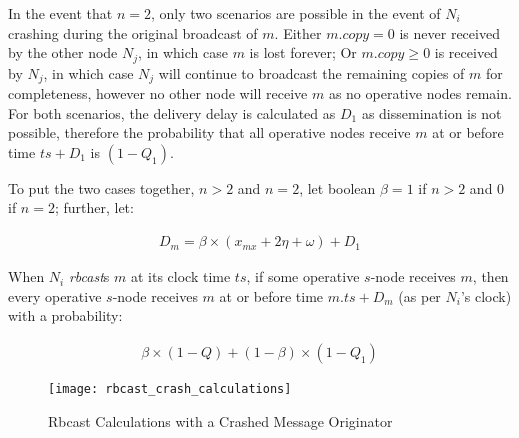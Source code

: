 In the event that $n = 2$, only two scenarios are possible in the event of $N_i$ crashing during the original broadcast of $m$.  Either $m.copy = 0$ is never received by the other node $N_j$, in which case $m$ is lost forever; Or $m.copy \geq 0$ is received by $N_j$, in which case $N_j$ will continue to broadcast the remaining copies of $m$ for completeness, however no other node will receive $m$ as no operative nodes remain.  For both scenarios, the delivery delay is calculated as $D_1$ as dissemination is not possible, therefore the probability that all operative nodes receive $m$ at or before time $ts+D_1$ is $(1-Q_1)$.  

To put the two cases together, $n > 2$ and $n = 2$, let boolean $\beta = 1$ if $n>2$ and $0$ if $n=2$; further, let: 

        \begin{equation*}
		    \begin{aligned}
		        D_m=\beta\times(x_{mx}+2\eta+\omega)+D_1
		    \end{aligned}
		\end{equation*}
		
When $N_i$ \emph{rbcast}s $m$ at its clock time $ts$, if some operative $s$-node receives $m$, then every operative $s$-node receives $m$ at or before time $m.ts+D_m$ (as per $N_i$'s clock) with a probability:

         \begin{equation*}
		    \begin{aligned}
		        \beta\times(1-Q)+(1-\beta)\times(1-Q_1)
		    \end{aligned}
		\end{equation*}

        \begin{sidewaysfigure}
            \vspace*{-1cm}
            \hspace*{-2.5cm}
            \centering
                \texttt{[image: rbcast\_crash\_calculations]}
            \caption[Rbcast Calculation Diagram with a Crashed Message Originator]{Rbcast Calculations with a Crashed Message Originator}
            \label{fig:rbcast_crash_calc}
       \end{sidewaysfigure}

				
